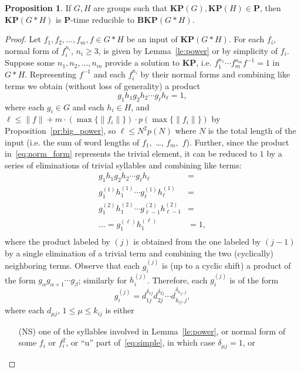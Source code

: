 \documentclass[10pt]{amsart}
\theoremstyle{definition}
\newtheorem{proposition}[theorem]{Proposition}
\def\P{{\mathbf{P}}}
\def\BKP{{\mathbf{BKP}}}
\def\KP{{\mathbf{KP}}}
\begin{document}
\begin{proposition}\label{pr:kp_to_bkp}
If $G,H$ are groups such that $\KP(G),\KP(H)\in\P$, then $\KP(G*H)$ is $\P$-time reducible to $\BKP(G*H)$.
\end{proposition}
\begin{proof}
Let $f_1,f_2,\ldots,f_m,f\in G*H$ be an input of $\KP(G*H)$. For each $f_i$, normal form of $f_i^{n_i}$, $n_i\ge 3$, is given by Lemma~\ref{le:power} or by simplicity of $f_i$. Suppose some $n_1,n_2,\ldots,n_m$ provide a solution to $\KP$, i.e. $f_1^{n_1}\cdots f_m^{n_m}f^{-1}=1$ in $G*H$. Representing $f^{-1}$ and each $f_i^{n_i}$ by their normal forms and combining like terms we obtain (without loss of generality) a product
\begin{equation}\label{eq:norm_form}
g_1h_1g_2h_2\cdots g_\ell h_\ell=1,
\end{equation}
where each $g_i\in G$ and each $h_i\in H$, and $\ell\le \|f\|+m\cdot (\max\{\|f_i\|\})\cdot p(\max\{\|f_i\|\})$ by Proposition~\ref{pr:big_power}, so $\ell\le N^2p(N)$ where $N$ is the total length of the input (i.e. the sum of word lengths of $f_1,$ \ldots, $f_m,$ $f$). Further, since the product in~\eqref{eq:norm_form} represents the trivial element, it can be reduced to $1$ by a series of eliminations of trivial syllables and combining like terms:
\begin{align*}
g_1h_1g_2h_2\cdots g_\ell h_\ell&=\\
g_1^{(1)}h_1^{(1)}\cdots g_\ell^{(1)}h_\ell^{(1)}&=\\
g_1^{(2)}h_1^{(2)}\cdots g_{\ell-1}^{(2)}h_{\ell-1}^{(2)}&=\\
\ldots=g_1^{(\ell)}h_1^{(\ell)}&=1,\\
\end{align*}
where the product labeled by $(j)$ is obtained from the one labeled by $(j-1)$ by a single elimination of a trivial term and combining the two (cyclically) neighboring terms. Observe that each $g_i^{(j)}$ is (up to a cyclic shift) a product of the form $g_\alpha g_{\alpha+1}\cdots g_\beta$; similarly for $h_i^{(j)}$. Therefore, each $g_i^{(j)}$ is of the form
\begin{equation}\label{eq:g_ij}
g_i^{(j)}=d_{1j}^{\delta_{1j}} d_{2j}^{\delta_{2j}}\cdots d_{k_{ij},j}^{\delta_{k_{ij},j}},
\end{equation}
where each $d_{\mu j}$, $1\le \mu\le k_{ij}$ is either
\begin{itemize}
\item[(NS)] one of the syllables involved in Lemma~\ref{le:power}, or normal form of some  $f_i$ or $f_i^2$, or ``u'' part of~\eqref{eq:simple}, in which case $\delta_{\mu j}=1$, or

\end{itemize}
\end{proof}
\end{document}
